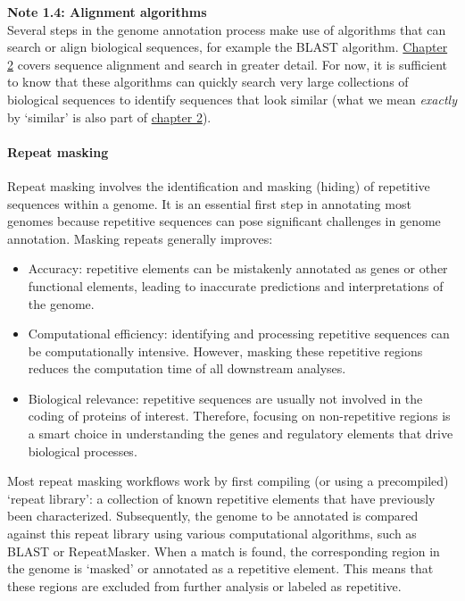 \begin{framed}
\textbf{Note 1.4: Alignment algorithms}\\
Several steps in the genome annotation process make use of algorithms that can search or align biological sequences, for example the BLAST algorithm.
\href{/chapter2}{Chapter 2} covers sequence alignment and search in greater detail.
For now, it is sufficient to know that these algorithms can quickly search very large collections of biological sequences to identify sequences that look similar (what we mean \textit{exactly} by `similar' is also part of \href{/chapter2}{chapter 2}).
\end{framed}

\paragraph{Repeat masking}\label{Chapter1_repeat_masking}

Repeat masking involves the identification and masking (hiding) of repetitive sequences within a genome.
It is an essential first step in annotating most genomes because repetitive sequences can pose significant challenges in genome annotation.
Masking repeats generally improves:

\begin{itemize}
\item Accuracy: repetitive elements can be mistakenly annotated as genes or other functional elements, leading to inaccurate predictions and interpretations of the genome.
\item Computational efficiency: identifying and processing repetitive sequences can be computationally intensive.
However, masking these repetitive regions reduces the computation time of all downstream analyses.
\item Biological relevance: repetitive sequences are usually not involved in the coding of proteins of interest.
Therefore, focusing on non-repetitive regions is a smart choice in understanding the genes and regulatory elements that drive biological processes.
\end{itemize}

Most repeat masking workflows work by first compiling (or using a precompiled) `repeat library': a collection of known repetitive elements that have previously been characterized.
Subsequently, the genome to be annotated is compared against this repeat library using various computational algorithms, such as BLAST or RepeatMasker.
When a match is found, the corresponding region in the genome is `masked' or annotated as a repetitive element.
This means that these regions are excluded from further analysis or labeled as repetitive.

